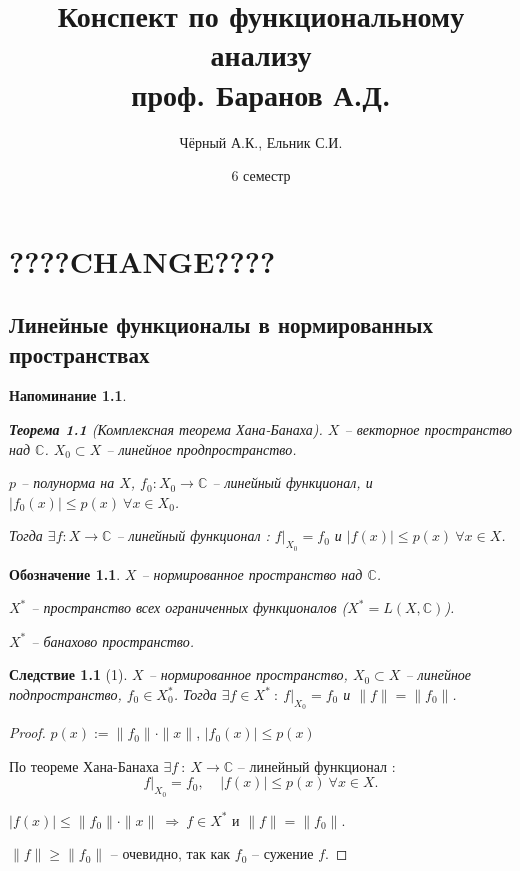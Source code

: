 \documentclass[12pt,a4paper]{report}
\author{Чёрный А.К., Ельник С.И.}
\title{Конспект по функциональному анализу \\ проф. Баранов А.Д.}
\date{6 семестр}
\newcommand{\then}{\ \Longrightarrow \ }
\renewcommand{\C}{\mathbb{C}}
\newtheorem*{thmnn}{Теорема}
\newtheorem*{con}{Следствие}
\newtheorem*{notation}{Напоминание}
\newtheorem*{design}{Обозначение}
\begin{document}
\maketitle

\setcounter{chapter}{5}

\chapter{????CHANGE????}

\setcounter{section}{97}
\section{Линейные функционалы в нормированных пространствах}

\begin{notation}
\begin{thmnn}[Комплексная теорема Хана-Банаха]
$X$ -- векторное пространство над $\C$. $X_0 \subset X$ -- линейное продпространство.

$p$ -- полунорма на $X$, $f_0: X_0 \to \C$ -- линейный функционал, и $|f_0(x)| \le p(x) \ \forall x \in X_0$.

Тогда $\exists f : X \to \C$ -- линейный функционал : $f \big|_{X_0} = f_0$ и $|f(x) | \le p(x) \ \forall x \in X$.

\end{thmnn}
\end{notation}

\begin{design}
$X$ -- нормированное пространство над $\C$.

$X^*$ -- пространство всех ограниченных функционалов ($X^* = L(X,\C)$).

$X^*$ -- банахово пространство.
\end{design}

\begin{con}[1]
$X$ -- нормированное пространство, $X_0 \subset X$ -- линейное подпространство, $f_0 \in X^*_0$. Тогда $\exists f \in X^* \ : \ f \big|_{X_0} = f_0$ и $\|f\| = \|f_0\|$.
\end{con}

\begin{proof}
$p(x) := \| f_0 \| \cdot \|x \|$, $|f_0(x)| \le p(x)$

По теореме Хана-Банаха $\exists f \ : \ X \to \C$ -- линейный функционал : 
$$f \big|_{X_0} = f_0,\ \ \ \ \ |f(x)| \le p(x) \ \forall x \in X.$$

$|f(x)| \le \|f_0 \| \cdot \|x\| \then f \in X^*$ и $\|f\| = \|f_0 \|$.

$\|f\| \ge \|f_0\|$ -- очевидно, так как $f_0$ -- сужение $f$.
\end{proof}
\end{document}
